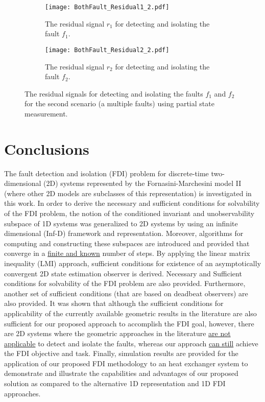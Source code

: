 \documentclass[journal,12pt,draftcls,onecolumn]{IEEEtran}
\begin{document}
\begin{figure}
	\centering
	\begin{subfigure}{0.45\textwidth}
		\texttt{[image: BothFault\_Residual1\_2.pdf]}
		\caption{The residual signal $r_1$ for detecting and isolating the fault $f_1$.}
		\label{fig:FaultBoth_Ff_2}
	\end{subfigure}
	\begin{subfigure}{0.45\textwidth}
		\texttt{[image: BothFault\_Residual2\_2.pdf]}
		\caption{The residual signal $r_2$ for detecting and isolating the fault $f_2$.}
		\label{fig:FaultBoth_Fl_2}
	\end{subfigure}
	\caption{The residual signals for detecting and isolating the faults $f_1$ and $f_2$ for the second scenario (a multiple faults) using partial state measurement.}
	\label{fig2:ScenarioII}
	\vspace{-2mm}
\end{figure}
\vspace{-2mm}
\section{Conclusions}\label{Sec:Conc}
The fault detection and isolation (FDI) problem for discrete-time two-dimensional (2D) systems represented by the Fornasini-Marchesini model II (where other 2D models are subclasses  of this representation) is investigated in this work. In order to derive the necessary and sufficient conditions for solvability of the FDI problem, the notion of the conditioned invariant and unobservability subspace of 1D systems was generalized to 2D systems by using an infinite dimensional (Inf-D) framework and representation. Moreover, algorithms for computing and constructing these subspaces are introduced and provided that converge in a \underline{finite and known} number of steps. By applying the linear matrix inequality (LMI) approach, sufficient conditions for existence of an asymptotically convergent 2D state estimation observer is derived. Necessary and Sufficient conditions for  solvability of the FDI problem are also provided.  Furthermore, another set of sufficient conditions (that are based on  deadbeat observers) are also provided. It was shown that although the sufficient conditions for applicability of  the currently available geometric results in the literature are also sufficient for our proposed approach to accomplish the FDI goal, however, there are 2D systems where the geometric approaches in the literature \underline{are not applicable} to detect and isolate the faults, whereas our approach \underline{can still} achieve the FDI objective and task. Finally, simulation results are provided for the application of our proposed FDI methodology to an heat exchanger system to demonstrate and illustrate the capabilities and advantages of our proposed solution as compared to the alternative 1D representation and 1D FDI approaches.
\appendix
\end{document}
